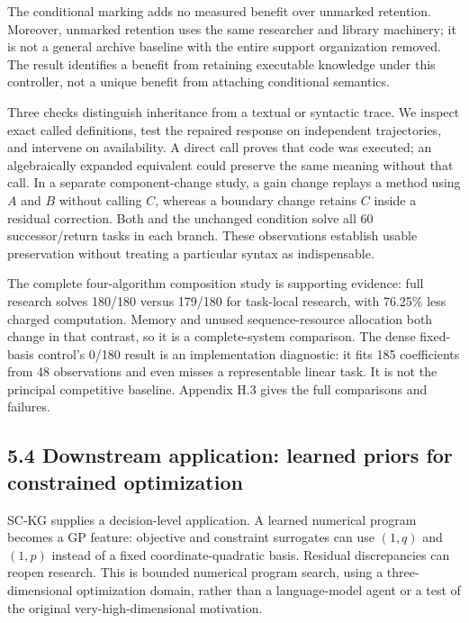 \documentclass[11pt,a4paper]{article}
\begin{document}
The conditional marking adds no measured benefit over unmarked retention. Moreover, unmarked retention uses the same researcher and library machinery; it is not a general archive baseline with the entire support organization removed. The result identifies a benefit from retaining executable knowledge under this controller, not a unique benefit from attaching conditional semantics.


Three checks distinguish inheritance from a textual or syntactic trace. We inspect exact called definitions, test the repaired response on independent trajectories, and intervene on availability. A direct call proves that code was executed; an algebraically expanded equivalent could preserve the same meaning without that call. In a separate component-change study, a gain change replays a method using \(A\) and \(B\) without calling \(C\), whereas a boundary change retains \(C\) inside a residual correction. Both and the unchanged condition solve all 60 successor/return tasks in each branch. These observations establish usable preservation without treating a particular syntax as indispensable.


The complete four-algorithm composition study is supporting evidence: full research solves 180/180 versus 179/180 for task-local research, with 76.25\% less charged computation. Memory and unused sequence-resource allocation both change in that contrast, so it is a complete-system comparison. The dense fixed-basis control's 0/180 result is an implementation diagnostic: it fits 185 coefficients from 48 observations and even misses a representable linear task. It is not the principal competitive baseline. Appendix H.3 gives the full comparisons and failures.


\subsection*{5.4 Downstream application: learned priors for constrained optimization}

SC-KG supplies a decision-level application. A learned numerical program becomes a GP feature: objective and constraint surrogates can use \((1,q)\) and \((1,p)\) instead of a fixed coordinate-quadratic basis. Residual discrepancies can reopen research. This is bounded numerical program search, using a three-dimensional optimization domain, rather than a language-model agent or a test of the original very-high-dimensional motivation.
\end{document}
